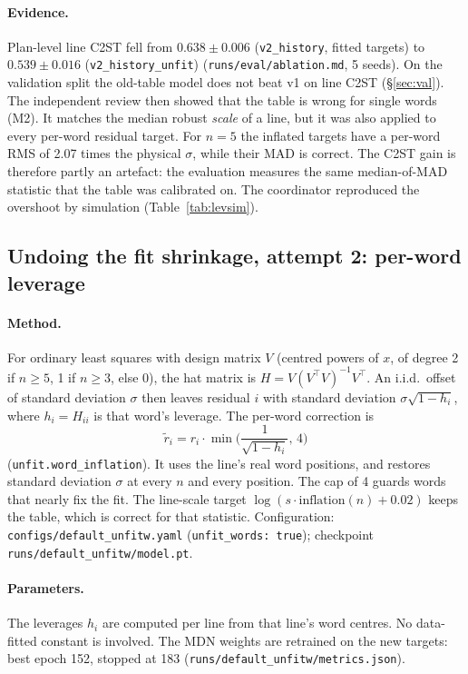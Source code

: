 \documentclass[11pt,a4paper]{article}
\newcommand{\src}[1]{{\footnotesize\texttt{#1}}}
\begin{document}
\paragraph{Evidence.} Plan-level line C2ST fell from $0.638\pm0.006$
(\texttt{v2\_history}, fitted targets) to $0.539\pm0.016$
(\texttt{v2\_history\_unfit}) (\src{runs/eval/ablation.md}, 5 seeds). On the
validation split the old-table model does not beat v1 on line C2ST
(\S\ref{sec:val}).
The independent review then showed that the table is wrong for single words
(M2). It matches the median robust \emph{scale} of a line, but it was also
applied to every per-word residual target. For $n=5$ the inflated targets have
a per-word RMS of 2.07 times the physical $\sigma$, while their MAD is correct.
The C2ST gain is therefore partly an artefact: the evaluation measures the same
median-of-MAD statistic that the table was calibrated on. The coordinator
reproduced the overshoot by simulation (Table~\ref{tab:levsim}).

\subsection{Undoing the fit shrinkage, attempt 2: per-word leverage}
\label{sec:lev}
\paragraph{Method.} For ordinary least squares with design matrix $V$ (centred
powers of $x$, of degree 2 if $n\ge5$, 1 if $n\ge3$, else 0), the hat matrix is
$H=V(V^\top V)^{-1}V^\top$. An i.i.d.\ offset of standard deviation $\sigma$
then leaves residual $i$ with standard deviation $\sigma\sqrt{1-h_i}$, where
$h_i=H_{ii}$ is that word's leverage. The per-word correction is
\begin{equation}
\tilde r_i = r_i\cdot\min\!\Big(\frac{1}{\sqrt{1-h_i}},\,4\Big)
\end{equation}
(\texttt{unfit.word\_inflation}). It uses the line's real word positions, and
restores standard deviation $\sigma$ at every $n$ and every position. The cap of
4 guards words that nearly fix the fit. The line-scale target
$\log(s\cdot\text{inflation}(n)+0.02)$ keeps the table, which is correct for
that statistic. Configuration: \texttt{configs/default\_unfitw.yaml}
(\texttt{unfit\_words: true}); checkpoint
\texttt{runs/default\_unfitw/model.pt}.

\paragraph{Parameters.} The leverages $h_i$ are computed per line from that
line's word centres. No data-fitted constant is involved. The MDN weights are
retrained on the new targets: best epoch 152, stopped at 183
(\src{runs/default\_unfitw/metrics.json}).
\end{document}
